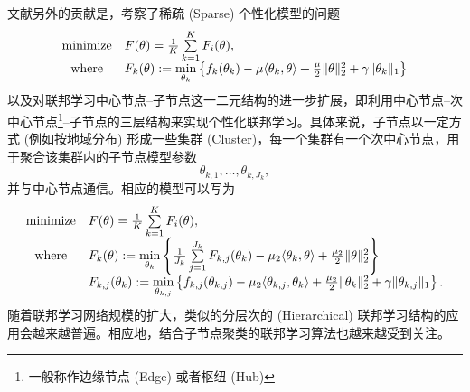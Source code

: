 文献\parencite{li2021pfedmac}另外的贡献是，考察了稀疏 (Sparse) 个性化模型的问题
\begin{equation}
\label{eq:pfedmac-sparse}
\begin{array}{cl}
\operatorname*{minimize} & F(\theta) = \frac{1}{K} \sum\limits_{k=1}^K F_i(\theta), \\
\text{where} & F_k(\theta) := \mathop{\rm min}\limits_{\theta_k} \left\{ f_k(\theta_k) - \mu \langle \theta_k, \theta \rangle + \frac{\mu}{2} \lVert \theta \rVert^2_2 + \gamma \lVert \theta_k \rVert_1 \right\}
\end{array}
\end{equation}
以及对联邦学习中心节点--子节点这一二元结构的进一步扩展，即利用中心节点--次中心节点\footnote{一般称作边缘节点 (Edge)\cite{Liu_2020_Hierarchical} 或者枢纽 (Hub)\cite{proxskip-vr}}--子节点的三层结构\cite{Liu_2020_Hierarchical}来实现个性化联邦学习。具体来说，子节点以一定方式 (例如按地域分布) 形成一些集群 (Cluster)，每一个集群有一个次中心节点，用于聚合该集群内的子节点模型参数
\begin{equation*}
\theta_{k,1}, \ldots, \theta_{k, J_k},
\end{equation*}
并与中心节点通信。相应的模型可以写为
\begin{equation}
\label{eq:pfedmac-sh}
\begin{array}{cl}
\operatorname*{minimize} & F(\theta) = \frac{1}{K} \sum\limits_{k=1}^K F_i(\theta), \\
\text{where} & F_k(\theta) := \mathop{\rm min}\limits_{\theta_k} \left\{ \frac{1}{J_k} \sum\limits_{j=1}^{J_k} F_{k, j} (\theta_k) - \mu_2 \langle \theta_k, \theta \rangle + \frac{\mu_2}{2} \lVert \theta \rVert^2_2 \right\} \\
& F_{k, j}(\theta_k) := \mathop{\rm min}\limits_{\theta_{k, j}} \left\{ f_{k, j} (\theta_{k, j}) - \mu_2 \langle \theta_{k, j}, \theta_k \rangle + \frac{\mu_2}{2} \lVert \theta_k \rVert^2_2 + \gamma \lVert \theta_{k, j} \rVert_1 \right\}.
\end{array}
\end{equation}
随着联邦学习网络规模的扩大，类似的分层次的 (Hierarchical) 联邦学习结构的应用会越来越普遍。相应地，结合子节点聚类的联邦学习算法也越来越受到关注\cite{Sattler_2021_cfl, Ghosh_2022_cfl, fl_fpfc_2022, Zhang_2023_fedmds}。
